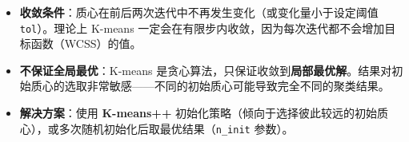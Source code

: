 \documentclass[a4paper,11pt]{ctexart}
\begin{document}
\begin{solutionbox}[参考答案与详细解析]
    \begin{keybox}
        \begin{itemize}
            \item \textbf{收敛条件}：质心在前后两次迭代中不再发生变化（或变化量小于设定阈值 \texttt{tol}）。理论上 K-means 一定会在有限步内收敛，因为每次迭代都不会增加目标函数（WCSS）的值。
            \item \textbf{不保证全局最优}：K-means 是贪心算法，只保证收敛到\textbf{局部最优解}。结果对初始质心的选取非常敏感——不同的初始质心可能导致完全不同的聚类结果。
            \item \textbf{解决方案}：使用 \textbf{K-means++} 初始化策略（倾向于选择彼此较远的初始质心），或多次随机初始化后取最优结果（\texttt{n\_init} 参数）。
        \end{itemize}
    \end{keybox}
\end{solutionbox}
\end{document}
